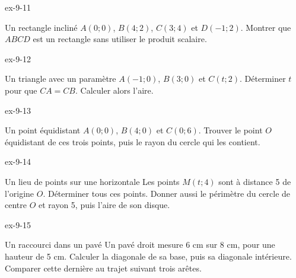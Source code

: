 \clearpage{}
\begin{blocLivre}{ex-9-11}
\begin{exercice}[3]{Un rectangle incliné}
$A(0;0)$, $B(4;2)$, $C(3;4)$ et $D(-1;2)$. Montrer que $ABCD$ est un rectangle sans utiliser le produit scalaire.
\label{fig-ex-9-11}
\end{exercice}
\end{blocLivre}
\begin{blocLivre}{ex-9-12}
\begin{exercice}[3]{Un triangle avec un paramètre}
$A(-1;0)$, $B(3;0)$ et $C(t;2)$. Déterminer $t$ pour que $CA=CB$. Calculer alors l’aire.
\label{fig-ex-9-12}
\end{exercice}
\end{blocLivre}
\begin{blocLivre}{ex-9-13}
\begin{exercice}[3]{Un point équidistant}
$A(0;0)$, $B(4;0)$ et $C(0;6)$. Trouver le point $O$ équidistant de ces trois points, puis le rayon du cercle qui les contient.
\label{fig-ex-9-13}
\end{exercice}
\end{blocLivre}
\begin{blocLivre}{ex-9-14}
\begin{exercice}[3]{Un lieu de points sur une horizontale}
Les points $M(t;4)$ sont à distance 5 de l’origine $O$. Déterminer tous ces points. Donner aussi le périmètre du cercle de centre $O$ et rayon 5, puis l’aire de son disque.
\label{fig-ex-9-14}
\end{exercice}
\end{blocLivre}
\begin{blocLivre}{ex-9-15}
\begin{exercice}[3]{Un raccourci dans un pavé}
Un pavé droit mesure 6 cm sur 8 cm, pour une hauteur de 5 cm. Calculer la diagonale de sa base, puis sa diagonale intérieure. Comparer cette dernière au trajet suivant trois arêtes.
\label{fig-ex-9-15}
\end{exercice}
\end{blocLivre}

\clearpage
